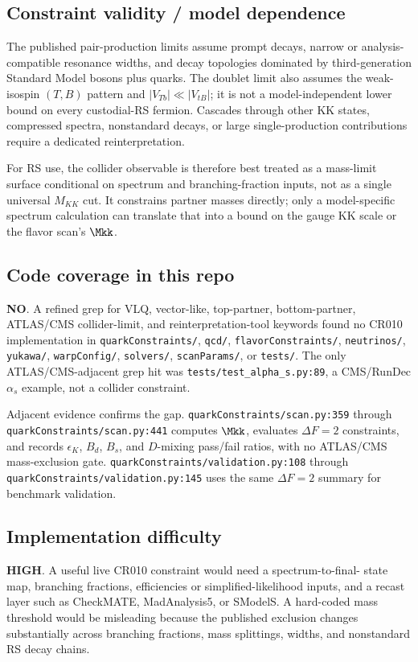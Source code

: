 \subsection*{Constraint validity / model dependence}
The published pair-production limits assume prompt decays, narrow or
analysis-compatible resonance widths, and decay topologies dominated by
third-generation Standard Model bosons plus quarks.  The doublet limit also
assumes the weak-isospin \((T,B)\) pattern and \(|V_{Tb}|\ll |V_{tB}|\); it is
not a model-independent lower bound on every custodial-RS fermion.  Cascades
through other KK states, compressed spectra, nonstandard decays, or large
single-production contributions require a dedicated reinterpretation.

For RS use, the collider observable is therefore best treated as a mass-limit
surface conditional on spectrum and branching-fraction inputs, not as a
single universal \(M_{KK}\) cut.  It constrains partner masses directly; only
a model-specific spectrum calculation can translate that into a bound on the
gauge KK scale or the flavor scan's \(\Mkk\).

\subsection*{Code coverage in this repo}
\textbf{NO}.  A refined grep for VLQ, vector-like, top-partner, bottom-partner,
ATLAS/CMS collider-limit, and reinterpretation-tool keywords found no CR010
implementation in \texttt{quarkConstraints/}, \texttt{qcd/},
\texttt{flavorConstraints/}, \texttt{neutrinos/}, \texttt{yukawa/},
\texttt{warpConfig/}, \texttt{solvers/}, \texttt{scanParams/}, or
\texttt{tests/}.  The only ATLAS/CMS-adjacent grep hit was
\texttt{tests/test\_alpha\_s.py:89}, a CMS/RunDec \(\alpha_s\) example, not a
collider constraint.

Adjacent evidence confirms the gap.  \texttt{quarkConstraints/scan.py:359} through
\texttt{quarkConstraints/scan.py:441}
computes \(\Mkk\), evaluates \(\Delta F=2\) constraints, and records
\(\epsilon_K\), \(B_d\), \(B_s\), and \(D\)-mixing pass/fail ratios, with no
ATLAS/CMS mass-exclusion gate.  \texttt{quarkConstraints/validation.py:108}
through \texttt{quarkConstraints/validation.py:145}
uses the same \(\Delta F=2\) summary for benchmark validation.

\subsection*{Implementation difficulty}
\textbf{HIGH}.  A useful live CR010 constraint would need a spectrum-to-final-
state map, branching fractions, efficiencies or simplified-likelihood inputs,
and a recast layer such as CheckMATE, MadAnalysis5, or SModelS.  A hard-coded
mass threshold would be misleading because the published exclusion changes
substantially across branching fractions, mass splittings, widths, and
nonstandard RS decay chains.

